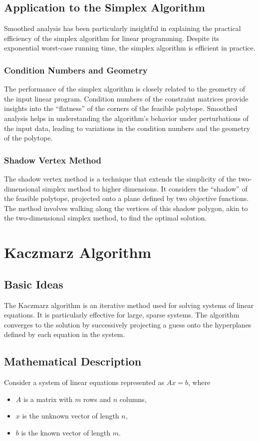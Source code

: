 \documentclass{article}
\begin{document}
\subsection{Application to the Simplex Algorithm}
Smoothed analysis has been particularly insightful in explaining the practical efficiency of the simplex algorithm for linear programming. Despite its exponential worst-case running time, the simplex algorithm is efficient in practice.

\subsubsection{Condition Numbers and Geometry}
The performance of the simplex algorithm is closely related to the geometry of the input linear program. Condition numbers of the constraint matrices provide insights into the “flatness” of the corners of the feasible polytope. Smoothed analysis helps in understanding the algorithm's behavior under perturbations of the input data, leading to variations in the condition numbers and the geometry of the polytope.

\subsubsection{Shadow Vertex Method}
The shadow vertex method is a technique that extends the simplicity of the two-dimensional simplex method to higher dimensions. It considers the “shadow” of the feasible polytope, projected onto a plane defined by two objective functions. The method involves walking along the vertices of this shadow polygon, akin to the two-dimensional simplex method, to find the optimal solution.

\section{Kaczmarz Algorithm}

\subsection{Basic Ideas}
The Kaczmarz algorithm is an iterative method used for solving systems of linear equations. It is particularly effective for large, sparse systems. The algorithm converges to the solution by successively projecting a guess onto the hyperplanes defined by each equation in the system.

\subsection{Mathematical Description}
Consider a system of linear equations represented as \(Ax = b\), where
\begin{itemize}
    \item \(A\) is a matrix with \(m\) rows and \(n\) columns,
    \item \(x\) is the unknown vector of length \(n\),
    \item \(b\) is the known vector of length \(m\).
\end{itemize}
\end{document}
